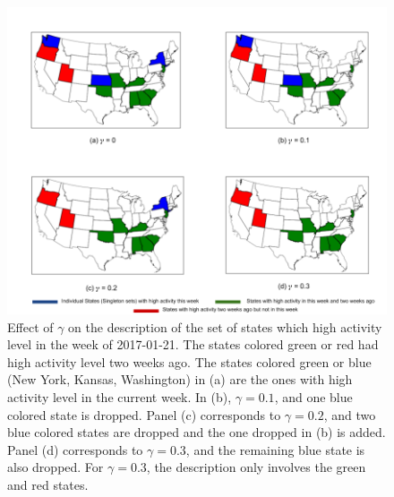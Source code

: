 \begin{figure}[!ht]
\centering
\includegraphics[scale = 0.5]{./figures/relax.png}
\caption{
Effect of $\gamma$ on the description of the set of states which high activity level
in the week of 2017-01-21. 
The states colored green or red had high activity level two weeks ago.
The states colored green or blue (New York, Kansas, Washington) 
in (a) are the ones with high activity level in the current week.
In (b), $\gamma=0.1$, and one blue colored state is dropped.
Panel (c) corresponds to $\gamma=0.2$, and two blue colored states are dropped and the one dropped in (b) is added.
Panel (d) corresponds to $\gamma=0.3$, and the remaining blue state is also dropped.
For $\gamma=0.3$, the description only involves the green and red states.
}
\label{fig:relaxeffect}
\end{figure}

